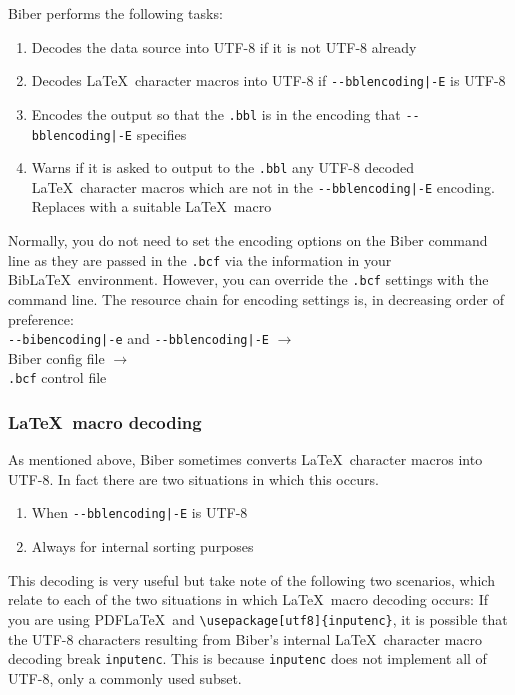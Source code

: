 \documentclass{ltxdockit}
\begin{document}
\noindent Biber performs the following tasks:

\begin{enumerate}
\item Decodes the data source into UTF-8 if it is not UTF-8 already
\item Decodes \LaTeX\ character macros into UTF-8 if \verb+--bblencoding|-E+
  is UTF-8
\item Encodes the output so that the \verb+.bbl+ is in
  the encoding that \verb+--bblencoding|-E+ specifies
\item Warns if it is asked to output to the \verb+.bbl+ any UTF-8
  decoded \LaTeX\ character macros which are not in the
  \verb+--bblencoding|-E+ encoding. Replaces with a suitable \LaTeX\ macro
\end{enumerate}

\noindent Normally, you do not need to set the encoding options on the
Biber command line as they are passed in the \verb+.bcf+ via the
information in your Bib\LaTeX\ environment. However, you can override
the \verb+.bcf+ settings with the command line. The resource chain for
encoding settings is, in decreasing order
of preference:\\[2ex]

\noindent\verb+--bibencoding|-e+ and \verb+--bblencoding|-E+ $\rightarrow$\\
\hspace*{1em}Biber config file $\rightarrow$\\
\hspace*{2em}\verb+.bcf+ control file

\subsubsection{\LaTeX\ macro decoding}\label{ldecode}

\noindent As mentioned above, Biber sometimes converts \LaTeX\
character macros into UTF-8. In fact there are two situations in which
this occurs.

\begin{enumerate}
\item When \verb+--bblencoding|-E+ is UTF-8
\item Always for internal sorting purposes
\end{enumerate}

\noindent This decoding is very useful but take note of the following
two scenarios, which relate to each of the two situations in which
\LaTeX\ macro decoding occurs:
\bigskip
{}
If you are using PDF\LaTeX\ and \verb+\usepackage[utf8]{inputenc}+, it
is possible that the UTF-8 characters resulting from Biber's
internal \LaTeX\ character macro decoding break \verb+inputenc+. This is
because \verb+inputenc+ does not implement all of UTF-8, only a
commonly used subset.
\end{document}
